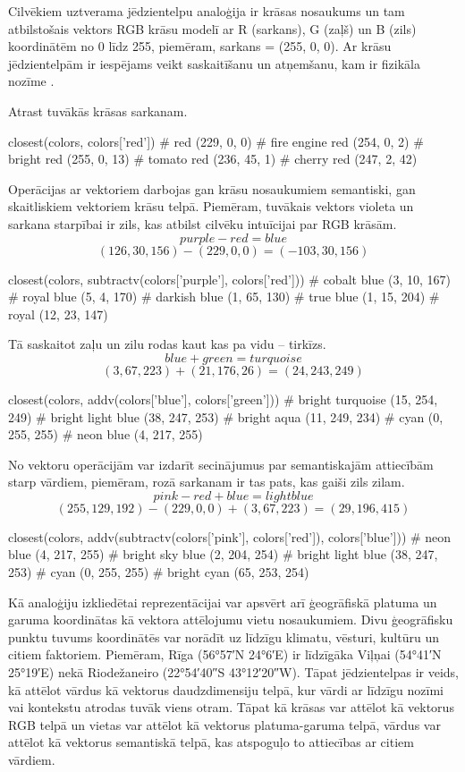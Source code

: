 Cilvēkiem uztverama jēdzientelpu analoģija ir krāsas nosaukums un tam atbilstošais vektors RGB krāsu modelī ar R (sarkans), G (zaļš) un B (zils) koordinātēm no 0 līdz 255, piemēram, sarkans = (255, 0, 0). Ar krāsu jēdzientelpām ir iespējams veikt saskaitīšanu un atņemšanu, kam ir fizikāla nozīme \cite{parrish2017}.

Atrast tuvākās krāsas sarkanam.
\begin{python}
closest(colors, colors['red'])
# red (229, 0, 0)
# fire engine red (254, 0, 2)
# bright red (255, 0, 13)
# tomato red (236, 45, 1)
# cherry red (247, 2, 42)
\end{python}

Operācijas ar vektoriem darbojas gan krāsu nosaukumiem semantiski, gan skaitliskiem vektoriem krāsu telpā. Piemēram, tuvākais vektors violeta un sarkana starpībai ir zils, kas atbilst cilvēku intuīcijai par RGB krāsām.
$$purple - red = blue$$
$$(126, 30, 156) - (229, 0, 0) = (-103, 30, 156)$$
\begin{python}
closest(colors, subtractv(colors['purple'], colors['red']))
# cobalt blue (3, 10, 167)
# royal blue (5, 4, 170)
# darkish blue (1, 65, 130)
# true blue (1, 15, 204)
# royal (12, 23, 147)
\end{python}

Tā saskaitot zaļu un zilu rodas kaut kas pa vidu -- tirkīzs.
$$blue + green = turquoise$$
$$(3, 67, 223) + (21, 176, 26) = (24, 243, 249)$$
\begin{python}
closest(colors, addv(colors['blue'], colors['green']))
# bright turquoise (15, 254, 249)
# bright light blue (38, 247, 253)
# bright aqua (11, 249, 234)
# cyan (0, 255, 255)
# neon blue (4, 217, 255)
\end{python}

No vektoru operācijām var izdarīt secinājumus par semantiskajām attiecībām starp vārdiem, piemēram, rozā sarkanam ir tas pats, kas gaiši zils zilam.
$$pink - red + blue = light blue$$
$$(255, 129, 192) - (229, 0, 0) + (3, 67, 223) = (29, 196, 415)$$
\begin{python}
closest(colors, addv(subtractv(colors['pink'], colors['red']), colors['blue']))
# neon blue (4, 217, 255)
# bright sky blue (2, 204, 254)
# bright light blue (38, 247, 253)
# cyan (0, 255, 255)
# bright cyan (65, 253, 254)
\end{python}

Kā analoģiju izkliedētai reprezentācijai var apsvērt arī ģeogrāfiskā platuma un garuma koordinātas kā vektora attēlojumu vietu nosaukumiem. Divu ģeogrāfisku punktu tuvums koordinātēs var norādīt uz līdzīgu klimatu, vēsturi, kultūru un citiem faktoriem. Piemēram, Rīga (56°57′N 24°6′E) ir līdzīgāka Viļņai (54°41′N 25°19′E) nekā Riodežaneiro (22°54′40″S 43°12′20″W). Tāpat jēdzientelpas ir veids, kā attēlot vārdus kā vektorus daudzdimensiju telpā, kur vārdi ar līdzīgu nozīmi vai kontekstu atrodas tuvāk viens otram. Tāpat kā krāsas var attēlot kā vektorus RGB telpā un vietas var attēlot kā vektorus platuma-garuma telpā, vārdus var attēlot kā vektorus semantiskā telpā, kas atspoguļo to attiecības ar citiem vārdiem.

